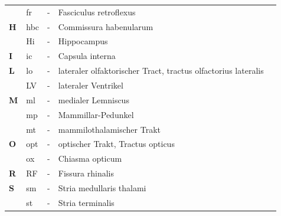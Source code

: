 \begin{table}[H]
\begin{tabular}{llcll}
\textbf{}  & fr  & -          & Fasciculus retroflexus                                                  &                               \\
\textbf{H} & hbc & -          & Commissura habenularum                                                  &                               \\
\textbf{}  & Hi  & -          & Hippocampus                                                             &                               \\
\textbf{I} & ic  & -          & Capsula interna                                                         &                               \\
\textbf{L} & lo  & -          & lateraler olfaktorischer Tract, tractus olfactorius lateralis           &                               \\
\textbf{}  & LV  & -          & lateraler Ventrikel                                                     &                               \\
\textbf{M} & ml  & -          & medialer Lemniscus                                                      &                               \\
\textbf{}  & mp  & -          & Mammillar-Pedunkel                                                       &                               \\
\textbf{}  & mt  & -          & mammilothalamischer Trakt                                               &                               \\
\textbf{O} & opt & -          & optischer Trakt, Tractus opticus                                        &                               \\
\textbf{}  & ox  & -          & Chiasma opticum                                                         &                               \\
\textbf{R} & RF  & -          & Fissura rhinalis                                                        &                               \\
\textbf{S} & sm  & -          & Stria medullaris thalami                                                &                               \\
\textbf{}  & st  & -          & Stria terminalis                                                        &                               \\
\end{tabular}
\end{table}

